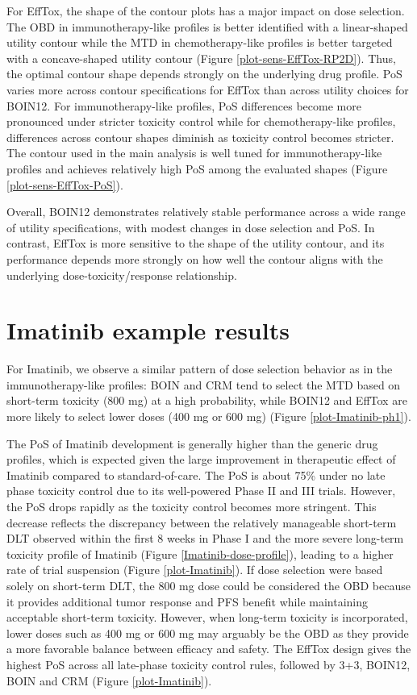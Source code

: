 \documentclass[11pt]{article}
\begin{document}
For EffTox, the shape of the contour plots has a major impact on dose selection. The OBD in immunotherapy-like profiles is better identified with a linear-shaped utility contour while the MTD in chemotherapy-like profiles is better targeted with a concave-shaped utility contour (Figure \ref{plot-sens-EffTox-RP2D}). Thus, the optimal contour shape depends strongly on the underlying drug profile. PoS varies more across contour specifications for EffTox than across utility choices for BOIN12. For immunotherapy-like profiles, PoS differences become more pronounced under stricter toxicity control while for chemotherapy-like profiles, differences across contour shapes diminish as toxicity control becomes stricter. The contour used in the main analysis is well tuned for immunotherapy-like profiles and achieves relatively high PoS among the evaluated shapes (Figure \ref{plot-sens-EffTox-PoS}). 

Overall, BOIN12 demonstrates relatively stable performance across a wide range of utility specifications, with modest changes in dose selection and PoS. In contrast, EffTox is more sensitive to the shape of the utility contour, and its performance depends more strongly on how well the contour aligns with the underlying dose-toxicity/response relationship.

\section{Imatinib example results}
For Imatinib, we observe a similar pattern of dose selection behavior as in the immunotherapy-like profiles: BOIN and CRM tend to select the MTD based on short-term toxicity (800 mg) at a high probability, while BOIN12 and EffTox are more likely to select lower doses (400 mg or 600 mg) (Figure \ref{plot-Imatinib-ph1}).

The PoS of Imatinib development is generally higher than the generic drug profiles, which is expected given the large improvement in therapeutic effect of Imatinib compared to standard-of-care. The PoS is about 75\% under no late phase toxicity control due to its well-powered Phase II and III trials. However, the PoS drops rapidly as the toxicity control becomes more stringent. This decrease reflects the discrepancy between the relatively manageable short-term DLT observed within the first 8 weeks in Phase I and the more severe long-term toxicity profile of Imatinib (Figure \ref{Imatinib-dose-profile}), leading to a higher rate of trial suspension (Figure \ref{plot-Imatinib}). If dose selection were based solely on short-term DLT, the 800 mg dose could be considered the OBD because it provides additional tumor response and PFS benefit while maintaining acceptable short-term toxicity. However, when long-term toxicity is incorporated, lower doses such as 400 mg or 600 mg may arguably be the OBD as they provide a more favorable balance between efficacy and safety. The EffTox design gives the highest PoS across all late-phase toxicity control rules, followed by 3+3, BOIN12, BOIN and CRM (Figure \ref{plot-Imatinib}). 
\end{document}
